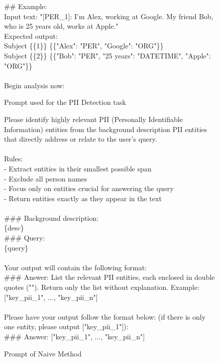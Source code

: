 \begin{figure*}[htbp]
\begin{tcolorbox}[colback=white, colframe=black, title=PII Detection Prompt]
\#\# Example:\\
Input text: "[PER\_1]: I'm Alex, working at Google. My friend Bob, who is 25 years old, works at Apple."\\
Expected output:\\
Subject \{\{1\}\} \{\{"Alex": "PER", "Google": "ORG"\}\}\\
Subject \{\{2\}\} \{\{"Bob": "PER", "25 years": "DATETIME", "Apple": "ORG"\}\}\\
\\
Begin analysis now:\\
\end{tcolorbox}
\caption{Prompt used for the PII Detection task}
\label{fig:eval_recog}
\end{figure*}

\begin{figure*}[htbp]
\begin{tcolorbox}[colback=white, colframe=black, title=Basic Query-related PII Detection Prompt]
Please identify highly relevant PII (Personally Identifiable Information) entities from the background description PII entities that directly address or relate to the user's query. \\
\\
Rules:\\
- Extract entities in their smallest possible span\\
- Exclude all person names\\
- Focus only on entities crucial for answering the query\\
- Return entities exactly as they appear in the text\\
\\
\#\#\# Background description:\\
\{desc\}\\
\#\#\# Query:\\
\{query\}\\
\\
Your output will contain the following format:\\
\#\#\# Answer: List the relevant PII entities, each enclosed in double quotes (""). Return only the list without explanation. Example: ["key\_pii\_1", ..., "key\_pii\_n"]\\
\\
Please have your output follow the format below: (if there is only one entity, please output ["key\_pii\_1"]):\\
\#\#\# Answer: ["key\_pii\_1", ..., "key\_pii\_n"]\\
\end{tcolorbox}
\caption{Prompt of Naive Method}
\label{fig:basic-prompt}
\end{figure*}

